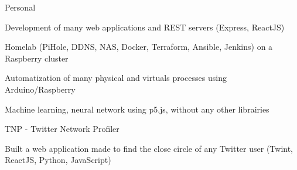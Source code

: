 
\begin{cventries}
  \cventry
    {} %
    {Personal} %
    {} %
    {} %
    {
      \begin{cvitems} %
        \item {Development of many web applications and REST servers (Express, ReactJS)}
        \item {Homelab (PiHole, DDNS, NAS, Docker, Terraform, Ansible, Jenkins) on a Raspberry cluster}
		\item {Automatization of many physical and virtuals processes using Arduino/Raspberry}
        \item {Machine learning, neural network using p5.js, without any other librairies}
      \end{cvitems}
    }

  \cventry
    {} %
    {TNP - Twitter Network Profiler} %
    {} %
    {} %
    {
      \begin{cvitems} %
      	\item {Built a web application made to find the close circle of any Twitter user (Twint, ReactJS, Python, JavaScript)}
      \end{cvitems}
    }
\end{cventries}